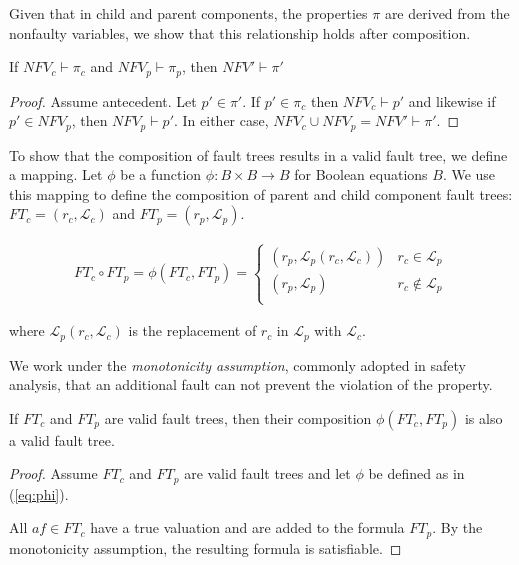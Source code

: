 Given that in child and parent components, the properties $\pi$ are derived from the nonfaulty variables, we show that this relationship holds after composition.

\begin{lemma} If $\mathit{NFV}_c \vdash \pi_c$ and $\mathit{NFV}_p \vdash \pi_p$, then $\mathit{NFV}' \vdash \pi'$
\begin{proof}
Assume antecedent. Let $p' \in \pi'$. If $p' \in \pi_c$ then $\mathit{NFV}_c \vdash p'$ and likewise if $p' \in \mathit{NFV}_p$, then $\mathit{NFV}_p \vdash p'$. In either case, $\mathit{NFV}_c \cup \mathit{NFV}_p = \mathit{NFV}' \vdash \pi'$.
\end{proof}
\end{lemma} 

To show that the composition of fault trees results in a valid fault tree, we define a mapping. Let $\phi$ be a function $\phi : B \times B \rightarrow B$ for Boolean equations $B$. We use this mapping to define the composition of parent and child component fault trees: $\mathit{FT}_c = (r_c, \mathcal{L}_c)$ and $\mathit{FT}_p = (r_p, \mathcal{L}_p)$.

\begin{gather}
\mathit{FT}_c \circ \mathit{FT}_p = \phi(\mathit{FT}_c, \mathit{FT}_p) =\begin{cases} 
      (r_p, \mathcal{L}_p(r_c, \mathcal{L}_c)) & r_c \in \mathcal{L}_p \\
      (r_p, \mathcal{L}_p) & r_c \not\in \mathcal{L}_p \\
   \end{cases}
\label{eq:phi}
\end{gather}

where $\mathcal{L}_p(r_c, \mathcal{L}_c)$ is the replacement of $r_c$ in $\mathcal{L}_p$ with $\mathcal{L}_c$.

We work under the {\em monotonicity assumption}, commonly adopted in safety analysis, that an additional fault can not prevent the violation of the property. 

\begin{lemma} If $\mathit{FT}_c$ and $\mathit{FT}_p$ are valid fault trees, then their composition $\phi(\mathit{FT}_c, \mathit{FT}_p)$ is also a valid fault tree. 
\begin{proof}
Assume $\mathit{FT}_c$ and $\mathit{FT}_p$ are valid fault trees and let $\phi$ be defined as in (\ref{eq:phi}).  

All $\mathit{af} \in \mathit{FT}_c$ have a true valuation and are added to the formula $\mathit{FT}_p$. By the monotonicity assumption, the resulting formula is satisfiable. 
\end{proof}
\label{lemma:validTree}
\end{lemma}

